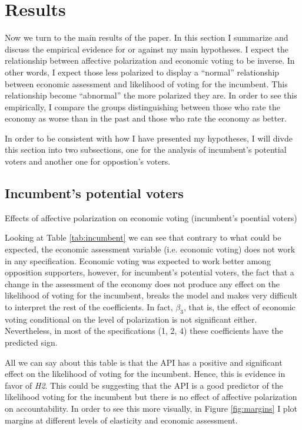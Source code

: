 \documentclass[a4paper, svgnames]{article}
\begin{document}
\newpage

\section{Results}

Now we turn to the main results of the paper. In this section I summarize and discuss the empirical evidence for or against my main hypotheses. I expect the relationship between affective polarization and economic voting to be inverse. In other words, I expect those less polarized to display a ``normal'' relationship between economic assessment and likelihood of voting for the incumbent. This relationship become ``abnormal'' the more polarized they are. In order to see this empirically, I compare the groups distinguishing between those who rate the economy as worse than in the past and those who rate the economy as better.

In order to be consistent with how I have presented my hypotheses, I will divde this section into two subsections, one for the analysis of incumbent's potential voters and another one for oppostion's voters.

\subsection{Incumbent's potential voters}

\begin{table}[H]
	\label{main_results}
	\centering
	\caption{\label{tab:incumbent} Effects of affective polarization on economic voting (incumbent's poential voters)}
	

\end{table}

Looking at Table \ref{tab:incumbent} we can see that contrary to what could be expected, the economic assessment variable (i.e. economic voting) does not work in any specification. Economic voting was expected to work better among opposition supporters, however, for incumbent's potential voters, the fact that a change in the assessment of the economy does not produce any effect on the likelihood of voting for the incumbent, breaks the model and makes very difficult to interpret the rest of the coefficients. In fact, $\beta_3$, that is, the effect of economic voting conditional on the level of polarization is not significant either. Nevertheless, in most of the specifications (1, 2, 4) these coefficients have the predicted sign.

All we can say about this table is that the API has a positive and significant effect on the likelihood of voting for the incumbent. Hence, this is evidence in favor of \textit{H2}. This could be suggesting that the API is a good predictor of the likelihood voting for the incumbent but there is no effect of affective polarization on accountability. In order to see this more visually, in Figure \ref{fig:margins} I plot margins at different levels of elasticity and economic assessment.
\end{document}
